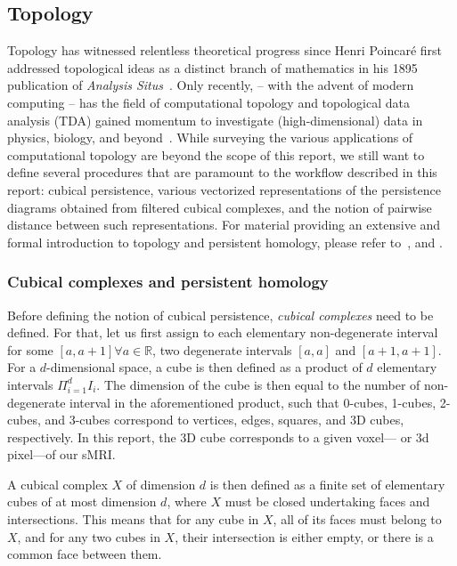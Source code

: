 \documentclass{article}
\begin{document}
\subsection{Topology}

Topology has witnessed relentless theoretical progress since Henri Poincaré first addressed
topological ideas as a distinct branch of mathematics in his 1895 publication of \textit{Analysis
Situs}~\citep{poincare1895analysis, james1999history}. Only recently, -- with the advent of modern
computing -- has the field of computational topology and topological data analysis (TDA) gained
momentum to investigate (high-dimensional) data in physics, biology, and
beyond~\citep{dey1999computational, ghrist2008barcodes, amezquita2020shape}. While surveying the
various applications of computational topology are beyond the scope of this report, we still want to
define several procedures that are paramount to the workflow described in this report: cubical
persistence, various vectorized representations of the persistence diagrams obtained from filtered
cubical complexes, and the notion of pairwise distance between such representations. For material
providing an extensive and formal introduction to topology and persistent homology, please refer
to~\citet{freedman2009algebraic, edelsbrunner2010computational}, and \citet{ghrist2008barcodes}.


\subsubsection{Cubical complexes and persistent homology}

Before defining the notion of cubical persistence, \emph{cubical complexes} need to be defined. For
that, let us first assign to each elementary non-degenerate interval for some $[a,a+1]\forall
a\in\mathbb{R}$, two degenerate intervals $[a,a]$ and $[a+1,a+1]$. For a
$d$-dimensional space, a cube is then defined as a product of $d$ elementary intervals
$\Pi_{i=1}^{d}I_i$. The dimension of the cube is then equal to the number of non-degenerate interval
in the aforementioned product, such that 0-cubes, 1-cubes, 2-cubes, and 3-cubes correspond to
vertices, edges, squares, and 3D cubes, respectively. In this report, the 3D cube corresponds to a
given voxel--- or 3d pixel---of our sMRI.

A cubical complex $X$ of dimension $d$ is then defined as a finite set of elementary cubes of at
most dimension $d$, where $X$ must be closed undertaking faces and intersections. This means that
for any cube in $X$, all of its faces must belong to $X$, and for any two cubes in $X$, their
intersection is either empty, or there is a common face between them.
\end{document}
